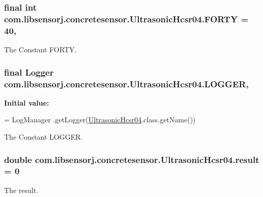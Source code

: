 \subsubsection[{F\+O\+R\+T\+Y}]{\setlength{\rightskip}{0pt plus 5cm}final int com.\+libsensorj.\+concretesensor.\+Ultrasonic\+Hcsr04.\+F\+O\+R\+T\+Y = 40\hspace{0.3cm}{\ttfamily [static]}, {\ttfamily [private]}}\label{classcom_1_1libsensorj_1_1concretesensor_1_1UltrasonicHcsr04_a7106eaa9f89d876a4749d502232964df}
The Constant F\+O\+R\+T\+Y. \hypertarget{classcom_1_1libsensorj_1_1concretesensor_1_1UltrasonicHcsr04_a9a3534d952f2668b69b0888b9e929abb}{}
\subsubsection[{L\+O\+G\+G\+E\+R}]{\setlength{\rightskip}{0pt plus 5cm}final Logger com.\+libsensorj.\+concretesensor.\+Ultrasonic\+Hcsr04.\+L\+O\+G\+G\+E\+R\hspace{0.3cm}{\ttfamily [static]}, {\ttfamily [private]}}\label{classcom_1_1libsensorj_1_1concretesensor_1_1UltrasonicHcsr04_a9a3534d952f2668b69b0888b9e929abb}
{\bfseries Initial value\+:}
\begin{DoxyCode}
= LogManager
            .getLogger(\hyperlink{classcom_1_1libsensorj_1_1concretesensor_1_1UltrasonicHcsr04_a7e02068d9acb1b3cf1d15d45afbf377b}{UltrasonicHcsr04}.class.getName())
\end{DoxyCode}
The Constant L\+O\+G\+G\+E\+R. \hypertarget{classcom_1_1libsensorj_1_1concretesensor_1_1UltrasonicHcsr04_aad32f417f9106fa8f3f2e2a7416f033b}{}
\subsubsection[{result}]{\setlength{\rightskip}{0pt plus 5cm}double com.\+libsensorj.\+concretesensor.\+Ultrasonic\+Hcsr04.\+result = 0\hspace{0.3cm}{\ttfamily [private]}}\label{classcom_1_1libsensorj_1_1concretesensor_1_1UltrasonicHcsr04_aad32f417f9106fa8f3f2e2a7416f033b}
The result. \hypertarget{classcom_1_1libsensorj_1_1concretesensor_1_1UltrasonicHcsr04_a25452283296d3780a7fefbfa20e40a93}{}
